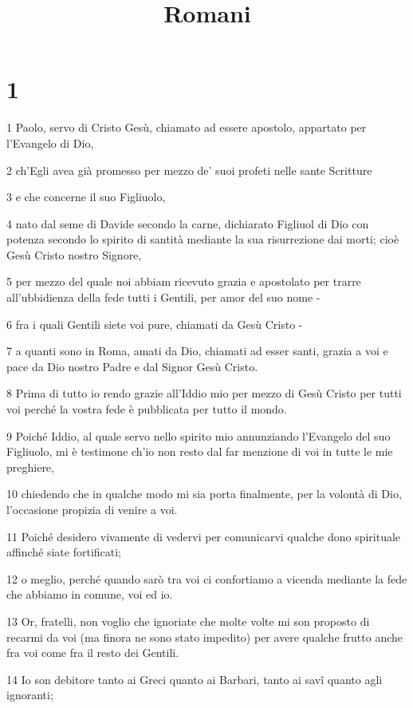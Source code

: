 

\title{Romani}


\chapter{1}

\par 1 Paolo, servo di Cristo Gesù, chiamato ad essere apostolo, appartato per l'Evangelo di Dio,
\par 2 ch'Egli avea già promesso per mezzo de' suoi profeti nelle sante Scritture
\par 3 e che concerne il suo Figliuolo,
\par 4 nato dal seme di Davide secondo la carne, dichiarato Figliuol di Dio con potenza secondo lo spirito di santità mediante la sua risurrezione dai morti; cioè Gesù Cristo nostro Signore,
\par 5 per mezzo del quale noi abbiam ricevuto grazia e apostolato per trarre all'ubbidienza della fede tutti i Gentili, per amor del suo nome -
\par 6 fra i quali Gentili siete voi pure, chiamati da Gesù Cristo -
\par 7 a quanti sono in Roma, amati da Dio, chiamati ad esser santi, grazia a voi e pace da Dio nostro Padre e dal Signor Gesù Cristo.
\par 8 Prima di tutto io rendo grazie all'Iddio mio per mezzo di Gesù Cristo per tutti voi perché la vostra fede è pubblicata per tutto il mondo.
\par 9 Poiché Iddio, al quale servo nello spirito mio annunziando l'Evangelo del suo Figliuolo, mi è testimone ch'io non resto dal far menzione di voi in tutte le mie preghiere,
\par 10 chiedendo che in qualche modo mi sia porta finalmente, per la volontà di Dio, l'occasione propizia di venire a voi.
\par 11 Poiché desidero vivamente di vedervi per comunicarvi qualche dono spirituale affinché siate fortificati;
\par 12 o meglio, perché quando sarò tra voi ci confortiamo a vicenda mediante la fede che abbiamo in comune, voi ed io.
\par 13 Or, fratelli, non voglio che ignoriate che molte volte mi son proposto di recarmi da voi (ma finora ne sono stato impedito) per avere qualche frutto anche fra voi come fra il resto dei Gentili.
\par 14 Io son debitore tanto ai Greci quanto ai Barbari, tanto ai savî quanto agli ignoranti;
